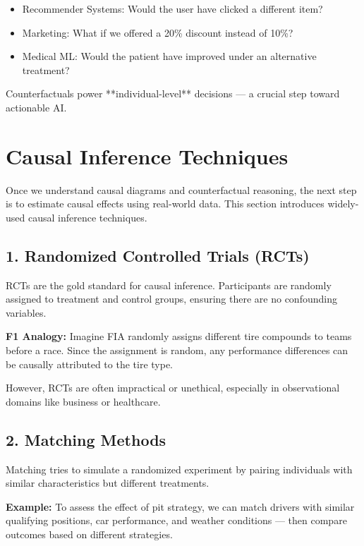 \documentclass[12pt]{book}
\begin{document}
\begin{itemize}
    \item Recommender Systems: Would the user have clicked a different item?
    \item Marketing: What if we offered a 20\% discount instead of 10\%?
    \item Medical ML: Would the patient have improved under an alternative treatment?
\end{itemize}

Counterfactuals power **individual-level** decisions — a crucial step toward actionable AI.

\section{Causal Inference Techniques}

Once we understand causal diagrams and counterfactual reasoning, the next step is to estimate causal effects using real-world data. This section introduces widely-used causal inference techniques.

\subsection*{1. Randomized Controlled Trials (RCTs)}

RCTs are the gold standard for causal inference. Participants are randomly assigned to treatment and control groups, ensuring there are no confounding variables.

\textbf{F1 Analogy:} Imagine FIA randomly assigns different tire compounds to teams before a race. Since the assignment is random, any performance differences can be causally attributed to the tire type.

However, RCTs are often impractical or unethical, especially in observational domains like business or healthcare.

\subsection*{2. Matching Methods}

Matching tries to simulate a randomized experiment by pairing individuals with similar characteristics but different treatments.

\textbf{Example:} To assess the effect of pit strategy, we can match drivers with similar qualifying positions, car performance, and weather conditions — then compare outcomes based on different strategies.
\end{document}
